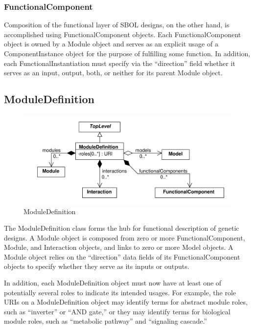 \documentclass[draftspec]{sbmlpkgspec}
\begin{document}
\subsubsection{FunctionalComponent}
\label{sec:FunctionalComponent}
Composition of the functional layer of SBOL designs, on the other hand, is accomplished using FunctionalComponent objects. Each FunctionalComponent object is owned by a Module object and serves as an explicit usage of a ComponentInstance object for the purpose of fulfilling some function. In addition, each FunctionalInstantiation must specify via the “direction” field whether it serves as an  input, output, both, or neither for its parent Module object. 




\subsection{ModuleDefinition}
\label{sec:ModuleDefinition}

\begin{figure}[ht]
\begin{center}
\includegraphics[scale=0.6]{uml/module_definition}
\caption[]{ModuleDefinition}
\label{uml:module_definition}
\end{center}
\end{figure}

The ModuleDefinition class forms the hub for functional description of genetic designs. A Module object is composed from zero or more FunctionalComponent, Module, and Interaction objects, and links to zero or more Model objects. A Module object relies on the “direction” data fields of its FunctionalComponent objects to specify whether they serve as its inputs or outputs.

In addition, each ModuleDefinition object must now have at least one of potentially several roles to indicate its intended usages. For example, the role URIs on a ModuleDefinition object may identify terms for abstract module roles, such as “inverter” or “AND gate,” or they may identify terms for biological module roles, such as “metabolic pathway” and “signaling cascade.”
\end{document}
